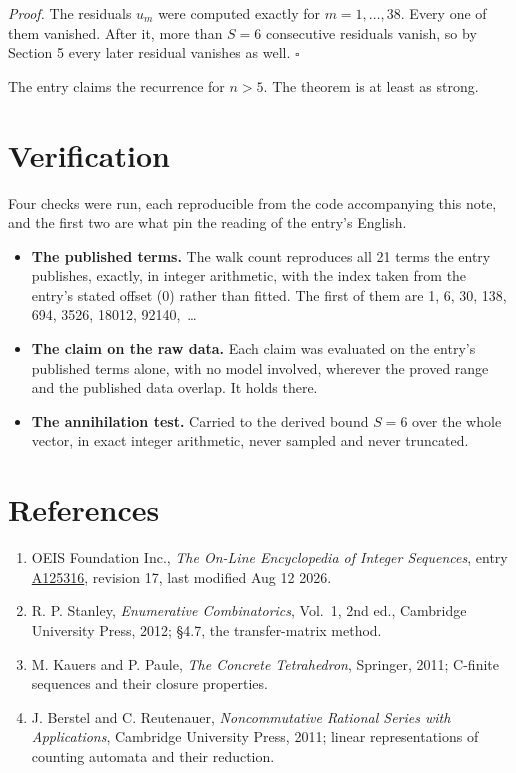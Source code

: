 \documentclass[11pt]{article}
\theoremstyle{definition}
\begin{document}
{\itshape Proof.} The residuals $u_m$ were computed exactly for $m = 1,\dots,38$. Every one of them vanished. After it, more than $S = 6$ consecutive residuals vanish, so by Section 5 every later residual vanishes as well. $\square$

The entry claims the recurrence for $n > 5$. The theorem is at least as strong.

\section{Verification}

Four checks were run, each reproducible from the code accompanying this note, and the first two are what pin the reading of the entry's English.

\begin{itemize}

\item {\bfseries The published terms.} The walk count reproduces all 21 terms the entry publishes, exactly, in integer arithmetic, with the index taken from the entry's stated offset (0) rather than fitted. The first of them are 1, 6, 30, 138, 694, 3526, 18012, 92140,~\dots

\item {\bfseries The claim on the raw data.} Each claim was evaluated on the entry's published terms alone, with no model involved, wherever the proved range and the published data overlap. It holds there.

\item {\bfseries The annihilation test.} Carried to the derived bound $S = 6$ over the whole vector, in exact integer arithmetic, never sampled and never truncated.

\end{itemize}

\section{References}

\begin{enumerate}

\item OEIS Foundation Inc., \emph{The On-Line Encyclopedia of Integer Sequences}, entry \href{https://oeis.org/A125316}{A125316}, revision 17, last modified Aug 12 2026.

\item R. P. Stanley, \emph{Enumerative Combinatorics}, Vol.~1, 2nd ed., Cambridge University Press, 2012; \S4.7, the transfer-matrix method.

\item M. Kauers and P. Paule, \emph{The Concrete Tetrahedron}, Springer, 2011; C-finite sequences and their closure properties.

\item J. Berstel and C. Reutenauer, \emph{Noncommutative Rational Series with Applications}, Cambridge University Press, 2011; linear representations of counting automata and their reduction.

\end{enumerate}
\end{document}
